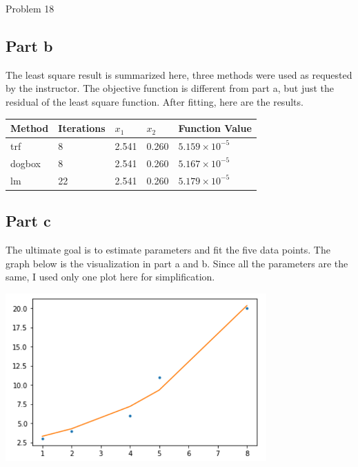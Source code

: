 \documentclass[10pt]{article}
\begin{document}
\begin{section}{Problem 18}
	\subsection{Part b}
	The least square result is summarized here, three methods were used as requested by the instructor. The objective function is different from part a, but just the residual of the least square function. After fitting, here are the results. 
	
	\begin{tabular}{lllll}
		\hline
		Method &Iterations & $x_1$ & $x_2$& Function Value \\
		\hline\hline
		trf  & 8  & 2.541  &  0.260 & $5.159\times 10^{-5}$  \\
		dogbox & 8   & 2.541  &   0.260 & $5.167\times 10^{-5}$  \\
		lm    & 22   & 2.541  &  0.260 & $5.179\times 10^{-5}$
	\end{tabular}

	
	\subsection{Part c}
	The ultimate goal is to estimate parameters and fit the five data points. The graph below is the visualization in part a and b. Since all the parameters are the same, I used only one plot here for simplification. 
	
	\includegraphics[width=10cm]{img/problem18_plt1.png}
	
\end{section}
\end{document}

